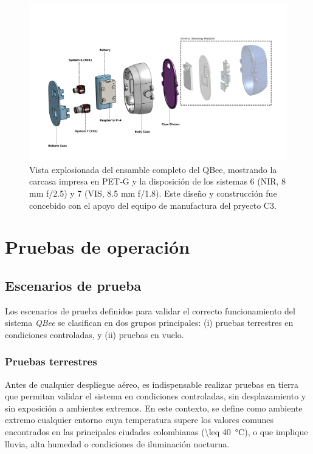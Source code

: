    

    \begin{figure}[h]
        \centering
        \includegraphics[width=1\linewidth]{Figures/C4/QBee.pdf}
        \caption{Vista explosionada del ensamble completo del QBee, mostrando la carcasa impresa en PET‑G y la disposición de los sistemas 6 (NIR, 8 mm f/2.5) y 7 (VIS, 8.5 mm f/1.8). Este diseño y construcción fue concebido con el apoyo del equipo de manufactura del pryecto C3.}
        \label{fig:exploded_assembly}
    \end{figure}

 

\section{Pruebas de operación}
  
  
  \subsection{Escenarios de prueba}
    Los escenarios de prueba definidos para validar el correcto funcionamiento del sistema \textit{QBee} se clasifican en dos grupos principales: (i) pruebas terrestres en condiciones controladas, y (ii) pruebas en vuelo.

    \subsubsection{Pruebas terrestres}
    
        Antes de cualquier despliegue aéreo, es indispensable realizar pruebas en tierra que permitan validar el sistema en condiciones controladas, sin desplazamiento y sin exposición a ambientes extremos. En este contexto, se define como ambiente extremo cualquier entorno cuya temperatura supere los valores comunes encontrados en las principales ciudades colombianas (\SI{\leq 40}{\celsius}), o que implique lluvia, alta humedad o condiciones de iluminación nocturna.
        
